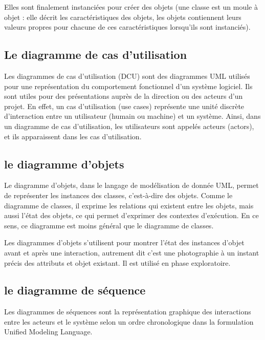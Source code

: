 Elles sont finalement instanciées pour créer des objets
(une classe est un moule à objet : elle décrit les caractéristiques des objets,
les objets contiennent leurs valeurs propres pour chacune de ces caractéristiques
lorsqu'ils sont instanciés).

\subsection{Le diagramme de cas d'utilisation}\label{subsec:diagrammes-de-cas-utilisation}
Les diagrammes de cas d'utilisation (DCU) sont des diagrammes UML utilisés pour une
représentation du comportement fonctionnel d'un système logiciel. Ils sont utiles
pour des présentations auprès de la direction ou des acteurs d'un projet.
En effet, un cas d'utilisation (use cases) représente une unité discrète d'interaction
entre un utilisateur (humain ou machine) et un système. Ainsi, dans un diagramme de
cas d'utilisation, les utilisateurs sont appelés acteurs (actors), et ils
apparaissent dans les cas d'utilisation.

\subsection{le diagramme d'objets}\label{subsec:diagrammes-d-objets}
Le diagramme d'objets, dans le langage de modélisation de donnée UML, permet de représenter
les instances des classes, c'est-à-dire des objets. Comme le diagramme de classes, il exprime
les relations qui existent entre les objets, mais aussi l'état des objets, ce qui permet d'exprimer
des contextes d'exécution. En ce sens, ce diagramme est moins général que le diagramme de classes.

Les diagrammes d'objets s'utilisent pour montrer l'état des instances d'objet avant et après une
interaction, autrement dit c'est une photographie à un instant précis des attributs et objet existant.
Il est utilisé en phase exploratoire.

\subsection{le diagramme de séquence}\label{subsec:diagrammes-de-sequence}
Les diagrammes de séquences sont la représentation graphique des interactions entre
les acteurs et le système selon un ordre chronologique dans la formulation Unified Modeling Language.

